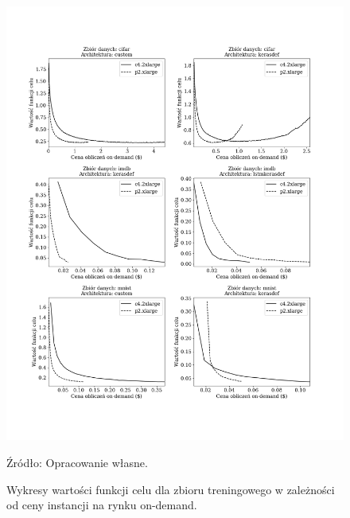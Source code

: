 \documentclass[12pt,a4paper,twoside]{article}
\newcommand{\source}[1]{\caption*{\hfill Źródło: {#1}} }
\begin{document}
\begin{figure}[h]
  \centering
\includegraphics[scale=0.5]{../obrazy/fig:experiment_loss_price_ond.png}
\caption{Wykresy wartości funkcji celu dla zbioru treningowego w zależności od ceny instancji na rynku on-demand.\label{fig:experiment_loss_price_ond}}
\source{Opracowanie własne.}
\end{figure}
\end{document}
